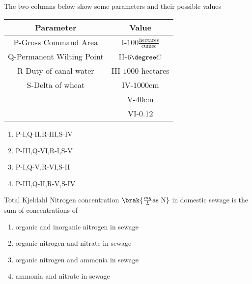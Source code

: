 \item{
The two columns below show some parameters and their possible values\\
\begin{table}[h!]    
  \centering
  \begin{tabular}[10pt]{ |c| c|}
    \hline
    \textbf{Parameter}& \textbf{Value}\\ 
    \hline
    P-Gross Command Area &I-$100\frac{\text{hectares}}{\text{cumec}}$\\
    \hline 
    Q-Permanent Wilting Point&II-$6\degree C$\\
    \hline 
    R-Duty of canal water&III-$1000$ hectares\\
    \hline
    S-Delta of wheat&IV-$1000$cm\\
    \hline
    &V-$40$cm\\
    \hline
    &VI-$0.12$\\
    \hline
    \end{tabular}
\end{table}
\begin{multicols}{2}
\begin{enumerate}
\item P-I,Q-II,R-III,S-IV
\item P-III,Q-VI,R-I,S-V
\item P-I,Q-V,R-VI,S-II
\item P-III,Q-II,R-V,S-IV
\end{enumerate}
\end{multicols}
}
\item{
Total Kjeldahl Nitrogen  concentration $\brak{\frac{mg}{L}\text{as N}}$ in domestic sewage is the sum of concentrations of
\begin{multicols}{2}
\begin{enumerate}
\item organic and inorganic nitrogen in sewage
\item organic nitrogen and nitrate in sewage
\item organic nitrogen and ammonia in sewage
\item ammonia and nitrate in sewage
\end{enumerate}
\end{multicols}
}
